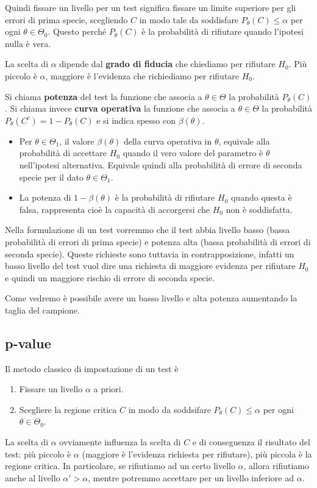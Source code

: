 Quindi fissare un livello per un test significa fissare un limite superiore per gli errori di
prima specie, scegliendo $C$ in modo tale da soddisfare $P_\theta (C) \leq \alpha$ per ogni
$\theta \in \Theta_0$. Questo perché $P_\theta(C)$ è la probabilità di rifiutare quando l'ipotesi
nulla è vera.

La scelta di $\alpha$ dipende dal \textbf{grado di fiducia} che chiediamo per rifiutare $H_0$. Più
piccolo è $\alpha$, maggiore è l'evidenza che richiediamo per rifiutare $H_0$.

\begin{definition}
	Si chiama \textbf{potenza} del test la funzione che associa a $\theta \in \Theta$ la
	probabilità $P_\theta(C)$. Si chiama invece \textbf{curva operativa} la funzione che associa
	a $\theta \in \Theta$ la probabilità $P_\theta (C^c) = 1 - P_\theta(C)$ e si indica spesso con
	$\beta(\theta)$.
	\begin{itemize}
		\item Per $\theta \in \Theta_1$, il valore $\beta(\theta)$ della curva operativa in
		      $\theta$, equivale alla probabilità di accettare $H_0$ quando il vero valore del
		      parametro è $\theta$ nell'ipotesi alternativa. Equivale quindi alla probabilità di
		      errore di seconda specie per il dato $\theta \in \Theta_1$.
		\item La potenza di $1 - \beta(\theta)$ è la probabilità di rifiutare $H_0$ quando questa
		      è falsa, rappresenta cioè la capacità di accorgersi che $H_0$ non è soddisfatta.
	\end{itemize}
\end{definition}

Nella formulazione di un test vorremmo che il test abbia livello basso (bassa probabilità di errori
di prima specie) e potenza alta (bassa probabilità di errori di seconda specie). Queste richieste
sono tuttavia in contrapposizione, infatti un basso livello del test vuol dire una richiesta di
maggiore evidenza per rifiutare $H_0$ e quindi un maggiore rischio di errore di seconda specie.

Come vedremo è possibile avere un basso livello e alta potenza aumentando la taglia del campione.

\subsection{p-value}
Il metodo classico di impostazione di un test è
\begin{enumerate}
	\item Fissare un livello $\alpha$ a priori.
	\item Scegliere la regione critica $C$ in modo da soddsifare $P_\theta(C) \leq \alpha$ per ogni
	      $\theta \in \Theta_0$.
\end{enumerate}
La scelta di $\alpha$ ovviamente influenza la scelta di $C$ e di conseguenza il risultato del test:
più piccolo è $\alpha$ (maggiore è l'evidenza richiesta per rifiutare), più piccola è la regione
critica. In particolare, se rifiutiamo ad un certo livello $\alpha$, allora rifiutiamo anche al
livello $\alpha' > \alpha$, mentre potremmo accettare per un livello inferiore ad $\alpha$.

